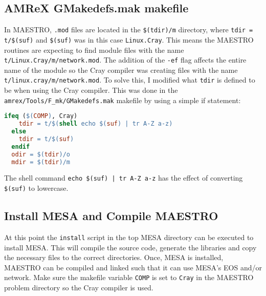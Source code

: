 \subsection{{\sf AMReX GMakedefs.mak} makefile}

In {\sf MAESTRO}, {\tt .mod} files are located in the {\tt \$(tdir)/m} 
directory, where {\tt tdir = t/\$(suf)} and {\tt \$(suf)} was in this case 
{\tt Linux.Cray}. This means the {\sf MAESTRO} routines are expecting to find 
module files with the name {\tt t/Linux.Cray/m/network.mod}. The addition of 
the {\tt -ef} flag affects the entire name of the module so the Cray compiler 
was creating files with the name {\tt t/linux.cray/m/network.mod}. To solve 
this, I modified what {\tt tdir} is defined to be when using the Cray compiler. 
This was done in the {\tt amrex/Tools/F\_mk/GMakedefs.mak} makefile by using 
a simple if statement:
\begin{lstlisting}[language=make,mathescape=false]
  ifeq ($(COMP), Cray)
    tdir = t/$(shell echo $(suf) | tr A-Z a-z)
  else
    tdir = t/$(suf)
  endif
  odir = $(tdir)/o
  mdir = $(tdir)/m
\end{lstlisting}
The shell command {\tt echo \$(suf) | tr A-Z a-z} has the effect of converting 
{\tt \$(suf)} to lowercase.

\subsection{Install {\sf MESA} and Compile {\sf MAESTRO}}

At this point the {\tt install} script in the top {\sf MESA} directory can be 
executed to install {\sf MESA}. This will compile the source code, generate 
the libraries and copy the necessary files to the correct directories. Once, 
{\sf MESA} is installed, {\sf MAESTRO} can be compiled and linked such that 
it can use {\sf MESA}'s EOS and/or network. Make sure the makefile variable 
{\tt COMP} is set to {\tt Cray} in the {\sf MAESTRO} problem directory 
so the Cray compiler is used.



